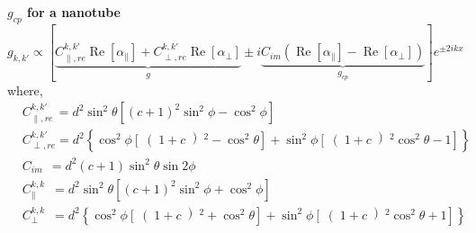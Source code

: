 \documentclass[journal=jacsat,manuscript=article]{achemso}
\begin{document}
\begin{suppinfo}
\textbf{$g_{cp}$ for a nanotube}
\begin{equation}
g_{k,k'} \propto \left[ \underbrace{C_{\parallel,re}^{k,k'} \operatorname{Re} \left[ \alpha_{\parallel} \right] + C_{\perp,re}^{k,k'} \operatorname{Re} \left[ \alpha_{\perp} \right]}_{g} \pm i \underbrace{C_{im} \left( \operatorname{Re} \left[ \alpha_{\parallel} \right] - \operatorname{Re} \left[ \alpha_{\perp} \right] \right)}_{g_{cp}} \right] e^{\pm 2 i k x} 
\end{equation}
where,
\begin{align*}
&C_{\parallel,re}^{k,k'} \,= d^2 \sin^2{\theta} \left[(c+1)^2 \sin^2{\phi} - \cos^2{\phi}\right]\\
&C_{\perp,re}^{k,k'} = d^2 \left\{ \cos^2{\phi} \left[ \right( 1 + c \left)^2 - \cos^2{\theta} \right] + \sin^2{\phi} \left[ \right( 1 + c \left)^2 \cos^2{\theta} - 1 \right] \right\}\\
&C_{im} \ \: = d^2(c+1) \sin^2{\theta} \sin{2\phi}\\
&C_{\parallel}^{k,k} \;\:\! = d^2 \sin^2{\theta} \left[(c+1)^2 \sin^2{\phi} + \cos^2{\phi}\right]\\
&C_{\perp}^{k,k} \;\:\! = d^2 \left\{ \cos^2{\phi} \left[ \right( 1 + c \left)^2 + \cos^2{\theta} \right] + \sin^2{\phi} \left[ \right( 1 + c \left)^2 \cos^2{\theta} + 1 \right] \right\}
\end{align*}

\end{suppinfo}


\end{document}
